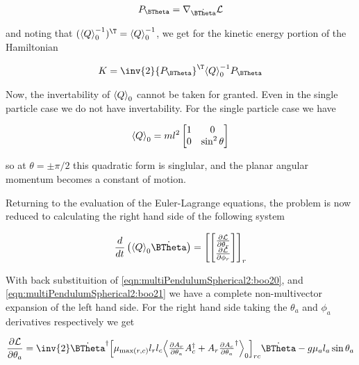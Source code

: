 \begin{align}\label{eqn:multiPendulumSpherical2:boo30}
P_{\BTheta} = \grad_{\dot{\BTheta}} \LL 
\end{align}

and noting that $(\gpgradezero{Q}^{-1})^\T = \gpgradezero{Q}^{-1}$, we get for the kinetic energy portion of the Hamiltonian 

\begin{align}\label{eqn:multiPendulumSpherical2:boo31}
K = \inv{2} {P_{\BTheta}}^\T \gpgradezero{Q}^{-1} P_{\BTheta}
\end{align}

Now, the invertability of ${\left\langle{{Q}}\right\rangle}_{0}$ cannot be taken for granted.  Even in the single particle case we do not have invertability.  For the single particle case we have

\begin{align}\label{eqn:multiPendulumSpherical2:boo45}
{\left\langle{{Q}}\right\rangle}_{0} =
m l^2 
\begin{bmatrix}
1 & 0 \\
0 & \sin^2 \theta
\end{bmatrix}
\end{align}

so at $\theta = \pm \pi/2$ this quadratic form is singlular, and the planar angular momentum becomes a constant of motion.

Returning to the evaluation of the Euler-Lagrange equations, the problem is now reduced to calculating the right hand side of the following system

\begin{align}\label{eqn:multiPendulumSpherical2:boo23}
\frac{d}{dt} \left( \gpgradezero{Q} \dot{\BTheta} \right) =
{\begin{bmatrix}
\begin{bmatrix}
\PD{\theta_r}{\LL} \\
\PD{\phi_r}{\LL} \\
\end{bmatrix}
\end{bmatrix}}_r
\end{align}

With back substituition of \ref{eqn:multiPendulumSpherical2:boo20}, and \ref{eqn:multiPendulumSpherical2:boo21} we have a complete non-multivector expansion of the left hand side.  For the right hand side taking the $\theta_a$ and $\phi_a$ derivatives respectively we get

\begin{align}\label{eqn:multiPendulumSpherical2:boo6}
\PD{\theta_a}{\LL}
=
\inv{2} \dot{\BTheta}^\dagger
{\begin{bmatrix}
\mu_{\max(r,c)} l_r l_c \gpgradezero{
\PD{\theta_a}{A_r} A_c^\dagger
+A_r \PD{\theta_a}{A_c}^\dagger
}
\end{bmatrix}}_{rc} 
\dot{\BTheta}
-g \mu_a l_a \sin\theta_a 
\end{align}

